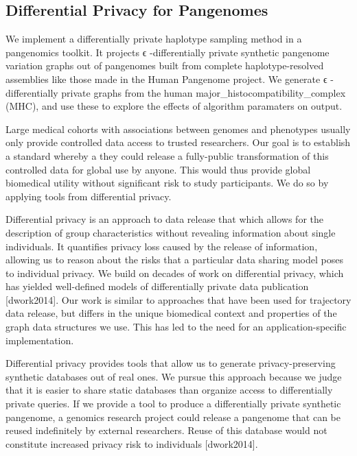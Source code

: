 \subsection{Differential Privacy for Pangenomes}
We implement a differentially private haplotype sampling method in a pangenomics toolkit. It projects ϵ
-differentially private synthetic pangenome variation graphs out of pangenomes built from complete haplotype-resolved assemblies like those made in the Human Pangenome project. We generate ϵ
-differentially private graphs from the human major_histocompatibility_complex (MHC), and use these to explore the effects of algorithm paramaters on output.

Large medical cohorts with associations between genomes and phenotypes usually only provide controlled data access to trusted researchers. Our goal is to establish a standard whereby a they could release a fully-public transformation of this controlled data for global use by anyone. This would thus provide global biomedical utility without significant risk to study participants. We do so by applying tools from differential privacy.

Differential privacy is an approach to data release that which allows for the description of group characteristics without revealing information about single individuals. It quantifies privacy loss caused by the release of information, allowing us to reason about the risks that a particular data sharing model poses to individual privacy. We build on decades of work on differential privacy, which has yielded well-defined models of differentially private data publication [dwork2014]. Our work is similar to approaches that have been used for trajectory data release, but differs in the unique biomedical context and properties of the graph data structures we use. This has led to the need for an application-specific implementation.

Differential privacy provides tools that allow us to generate privacy-preserving synthetic databases out of real ones. We pursue this approach because we judge that it is easier to share static databases than organize access to differentially private queries. If we provide a tool to produce a differentially private synthetic pangenome, a genomics research project could release a pangenome that can be reused indefinitely by external researchers. Reuse of this database would not constitute increased privacy risk to individuals [dwork2014].
